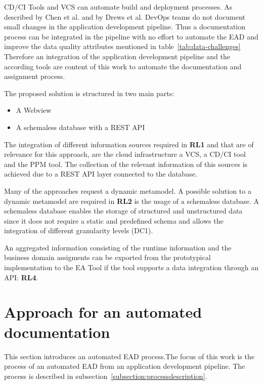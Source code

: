 CD/CI Tools and VCS can automate build and deployment processes. As described by Chen et al. and by Drews et al. DevOps teams do not document small changes in the application development pipeline. Thus a documentation process can be integrated in the pipeline with no effort to automate the EAD and improve the data quality attributes mentioned in table~\ref{tab:data-challenges} Therefore an integration of the application development pipeline and the according tools are content of this work to automate the documentation and assignment process.

The proposed solution is structured in two main parts:
\begin{itemize}
    \item A Webview
    \item A schemaless database with a REST API
\end{itemize}

The integration of different information sources required in \textbf{RL1} and that are of relevance for this approach, are the cloud infrastructure a VCS, a CD/CI tool and the PPM tool. The collection of the relevant information of this sources is achieved due to a REST API layer connected to the database.

Many of the approaches request a dynamic metamodel. A possible solution to a dynamic metamodel are required in \textbf{RL2} is the usage of a schemaless database. A schemaless database enables the storage of structured and unstructured data since it does not require a static and predefined schema and allows the integration of different granularity levels (DC1).

An aggregated information consisting of the runtime information and the business domain assigments can be exported from the prototypical implementation to the EA Tool if the tool supports a data integration through an API: \textbf{RL4}.

\section{Approach for an automated documentation}\label{section:approach-ead}

This section introduces an automated EAD process.The focus of this work is the process of an automated EAD from an application development pipeline. The process is described in subsection~\ref{subsection:processdescription}.

